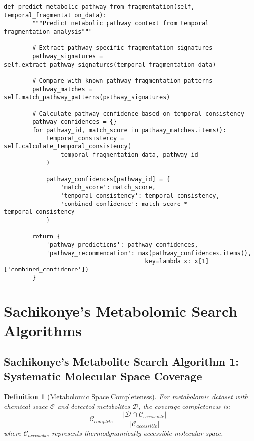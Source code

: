 \documentclass[12pt,a4paper]{article}
\newtheorem{definition}{Definition}
\begin{document}
\begin{lstlisting}[style=pythonstyle, caption=Temporal Fragmentation Analysis]
    def predict_metabolic_pathway_from_fragmentation(self, temporal_fragmentation_data):
        """Predict metabolic pathway context from temporal fragmentation analysis"""
        
        # Extract pathway-specific fragmentation signatures
        pathway_signatures = self.extract_pathway_signatures(temporal_fragmentation_data)
        
        # Compare with known pathway fragmentation patterns
        pathway_matches = self.match_pathway_patterns(pathway_signatures)
        
        # Calculate pathway confidence based on temporal consistency
        pathway_confidences = {}
        for pathway_id, match_score in pathway_matches.items():
            temporal_consistency = self.calculate_temporal_consistency(
                temporal_fragmentation_data, pathway_id
            )
            
            pathway_confidences[pathway_id] = {
                'match_score': match_score,
                'temporal_consistency': temporal_consistency,
                'combined_confidence': match_score * temporal_consistency
            }
        
        return {
            'pathway_predictions': pathway_confidences,
            'pathway_recommendation': max(pathway_confidences.items(), 
                                        key=lambda x: x[1]['combined_confidence'])
        }
\end{lstlisting}

\section{Sachikonye's Metabolomic Search Algorithms}

\subsection{Sachikonye's Metabolite Search Algorithm 1: Systematic Molecular Space Coverage}

\begin{definition}[Metabolomic Space Completeness]
For metabolomic dataset with chemical space $\mathcal{C}$ and detected metabolites $\mathcal{D}$, the coverage completeness is:
\begin{equation}
\mathcal{C}_{complete} = \frac{|\mathcal{D} \cap \mathcal{C}_{accessible}|}{|\mathcal{C}_{accessible}|}
\end{equation}
where $\mathcal{C}_{accessible}$ represents thermodynamically accessible molecular space.
\end{definition}
\end{document}
